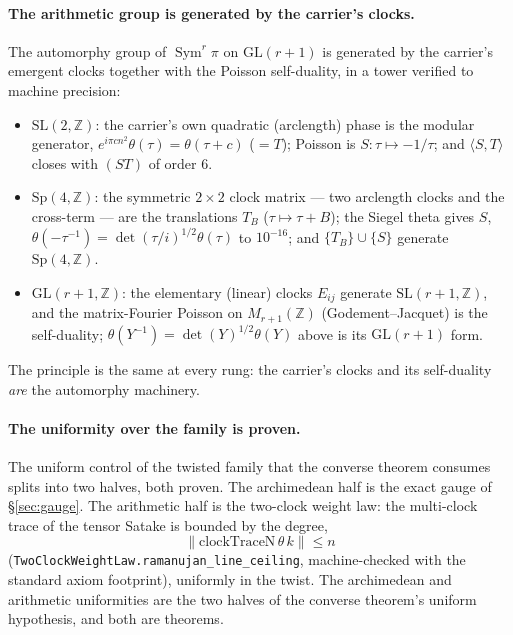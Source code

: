 \documentclass[11pt]{article}
\theoremstyle{definition}
\newcommand{\Sym}{\operatorname{Sym}}
\begin{document}
\paragraph{The arithmetic group is generated by the carrier's clocks.} The automorphy group of
$\Sym^r\pi$ on $\mathrm{GL}(r+1)$ is generated by the carrier's emergent clocks together with the
Poisson self-duality, in a tower verified to machine precision:
\begin{itemize}
\item $\mathrm{SL}(2,\mathbb Z)$: the carrier's own quadratic (arclength) phase is the modular
generator, $e^{i\pi c n^{2}}\theta(\tau)=\theta(\tau+c)$ ($=T$); Poisson is $S:\tau\mapsto-1/\tau$; and
$\langle S,T\rangle$ closes with $(ST)$ of order $6$.
\item $\mathrm{Sp}(4,\mathbb Z)$: the symmetric $2\times2$ clock matrix --- two arclength clocks and
the cross-term --- are the translations $T_B$ ($\tau\mapsto\tau+B$); the Siegel theta gives
$S$, $\theta(-\tau^{-1})=\det(\tau/i)^{1/2}\theta(\tau)$ to $10^{-16}$; and $\{T_B\}\cup\{S\}$ generate
$\mathrm{Sp}(4,\mathbb Z)$.
\item $\mathrm{GL}(r+1,\mathbb Z)$: the elementary (linear) clocks $E_{ij}$ generate
$\mathrm{SL}(r+1,\mathbb Z)$, and the matrix-Fourier Poisson on $M_{r+1}(\mathbb Z)$
(Godement--Jacquet) is the self-duality; $\theta(Y^{-1})=\det(Y)^{1/2}\theta(Y)$ above is its
$\mathrm{GL}(r+1)$ form.
\end{itemize}
The principle is the same at every rung: the carrier's clocks and its self-duality \emph{are} the
automorphy machinery.

\paragraph{The uniformity over the family is proven.} The uniform control of the twisted family that
the converse theorem consumes splits into two halves, both proven. The archimedean half is the exact
gauge of \S\ref{sec:gauge}. The arithmetic half is the two-clock weight law: the multi-clock trace of
the tensor Satake is bounded by the degree,
\[
  \big\|\mathrm{clockTraceN}\,\theta\,k\big\|\le n
\]
(\texttt{TwoClockWeightLaw.ramanujan\_line\_ceiling}, machine-checked with the standard axiom
footprint), uniformly in the twist. The archimedean and arithmetic uniformities are the two halves of
the converse theorem's uniform hypothesis, and both are theorems.
\end{document}
